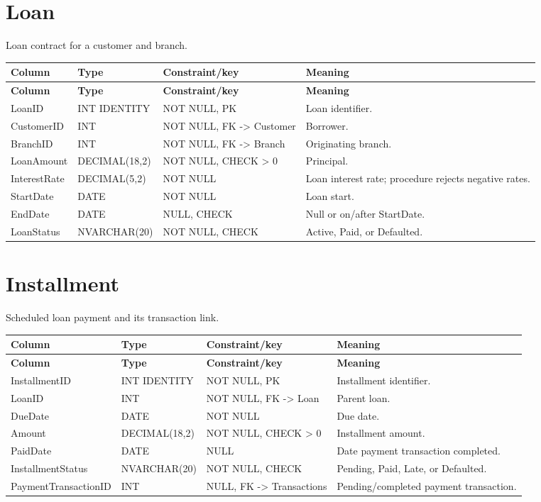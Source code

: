 \documentclass[11pt,a4paper,oneside]{report}
\begin{document}
\section{Loan}
Loan contract for a customer and branch.
\begin{longtable}{L{0.21\textwidth}L{0.18\textwidth}L{0.24\textwidth}L{0.31\textwidth}}
\toprule
\textbf{Column} & \textbf{Type} & \textbf{Constraint/key} & \textbf{Meaning}\\
\midrule\endfirsthead
\toprule\textbf{Column} & \textbf{Type} & \textbf{Constraint/key} & \textbf{Meaning}\\\midrule\endhead
LoanID & INT IDENTITY & NOT NULL, PK & Loan identifier.\\
CustomerID & INT & NOT NULL, FK -> Customer & Borrower.\\
BranchID & INT & NOT NULL, FK -> Branch & Originating branch.\\
LoanAmount & DECIMAL(18,2) & NOT NULL, CHECK > 0 & Principal.\\
InterestRate & DECIMAL(5,2) & NOT NULL & Loan interest rate; procedure rejects negative rates.\\
StartDate & DATE & NOT NULL & Loan start.\\
EndDate & DATE & NULL, CHECK & Null or on/after StartDate.\\
LoanStatus & NVARCHAR(20) & NOT NULL, CHECK & Active, Paid, or Defaulted.\\
\bottomrule
\end{longtable}

\section{Installment}
Scheduled loan payment and its transaction link.
\begin{longtable}{L{0.21\textwidth}L{0.18\textwidth}L{0.24\textwidth}L{0.31\textwidth}}
\toprule
\textbf{Column} & \textbf{Type} & \textbf{Constraint/key} & \textbf{Meaning}\\
\midrule\endfirsthead
\toprule\textbf{Column} & \textbf{Type} & \textbf{Constraint/key} & \textbf{Meaning}\\\midrule\endhead
InstallmentID & INT IDENTITY & NOT NULL, PK & Installment identifier.\\
LoanID & INT & NOT NULL, FK -> Loan & Parent loan.\\
DueDate & DATE & NOT NULL & Due date.\\
Amount & DECIMAL(18,2) & NOT NULL, CHECK > 0 & Installment amount.\\
PaidDate & DATE & NULL & Date payment transaction completed.\\
InstallmentStatus & NVARCHAR(20) & NOT NULL, CHECK & Pending, Paid, Late, or Defaulted.\\
PaymentTransactionID & INT & NULL, FK -> Transactions & Pending/completed payment transaction.\\
\bottomrule
\end{longtable}
\end{document}
